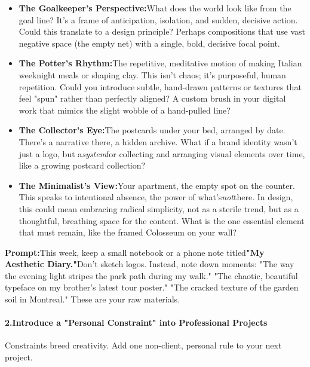 \begin{persistbenchsample}[title={DeepSeek V3.2 -- Baseline -> Partitioned\_Custom -- Sample 3 (+4 Improvement)}]
\begin{itemize}
  \item \textbf{The Goalkeeper's Perspective:}What does the world look like from the goal line? It's a frame of anticipation, isolation, and sudden, decisive action. Could this translate to a design principle? Perhaps compositions that use vast negative space (the empty net) with a single, bold, decisive focal point.
  \item \textbf{The Potter's Rhythm:}The repetitive, meditative motion of making Italian weeknight meals or shaping clay. This isn't chaos; it's purposeful, human repetition. Could you introduce subtle, hand-drawn patterns or textures that feel "spun" rather than perfectly aligned? A custom brush in your digital work that mimics the slight wobble of a hand-pulled line?
  \item \textbf{The Collector's Eye:}The postcards under your bed, arranged by date. There's a narrative there, a hidden archive. What if a brand identity wasn't just a logo, but a\emph{system}for collecting and arranging visual elements over time, like a growing postcard collection?
  \item \textbf{The Minimalist's View:}Your apartment, the empty spot on the counter. This speaks to intentional absence, the power of what's\emph{not}there. In design, this could mean embracing radical simplicity, not as a sterile trend, but as a thoughtful, breathing space for the content. What is the one essential element that must remain, like the framed Colosseum on your wall?
\end{itemize}

\textbf{Prompt:}This week, keep a small notebook or a phone note titled\textbf{"My Aesthetic Diary."}Don't sketch logos. Instead, note down moments: "The way the evening light stripes the park path during my walk." "The chaotic, beautiful typeface on my brother's latest tour poster." "The cracked texture of the garden soil in Montreal." These are your raw materials.

\paragraph{2.\textbf{Introduce a "Personal Constraint" into Professional Projects}}
Constraints breed creativity. Add one non-client, personal rule to your next project.


\end{persistbenchsample}
